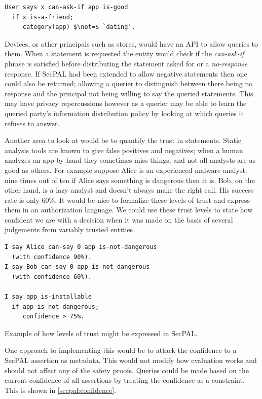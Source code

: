 \documentclass[a4paper,sfsidenotes]{%
  scrartcl%
}
\begin{document}
\begin{lstlisting}[language=SecPAL,mathescape=true]
User says x can-ask-if app is-good
  if x is-a-friend;
     category(app) $\not=$ `dating'.
\end{lstlisting}

Devices, or other principals such as stores, would have an API to allow queries
to them. When a statement is requested the entity would check if
the \emph{can-ask-if} phrase is satisfied before distributing the statement
asked for or a \emph{no-response} response.  If SecPAL had been extended
to allow negative statements then one could also be returned; allowing a querier
to distinguish between there being no response and the principal not being
willing to say the queried statements.  This may have privacy repercussions
however as a querier may be able to learn the queried party's information
distribution policy by looking at which queries it refuses to answer.  

Another area to look at would be to quantify the trust in statements. Static
analysis tools are known to give false positives and negatives; when a human
analyzes an app by hand they sometimes miss things; and not all analysts are as
good as others.  For example suppose Alice is an experienced malware analyst:
nine times out of ten if Alice says something is dangerous then it is.  Bob, on
the other hand, is a lazy analyst and doesn't always make the right call.  His
success rate is only 60\%.  It would be nice to formalize these levels of trust
and express them in an authorization language. We could use these trust levels
to state how confident we are with a decision when it was made on the basis of
several judgements from variably trusted entities.

\begin{marginfigure}
  \begin{lstlisting}[language=SecPAL]
I say Alice can-say 0 app is-not-dangerous 
  (with confidence 90%).
I say Bob can-say 0 app is-not-dangerous
  (with confidence 60%).

I say app is-installable 
  if app is-not-dangerous;
     confidence > 75%.
  \end{lstlisting}
  \caption{Example of how levels of trust might be expressed in SecPAL.}
  \label{secpal:confidence}
\end{marginfigure}

One approach to implementing this would be to attack the confidence to a SecPAL
assertion as metadata.  This would not modify how evaluation works
and should not affect any of the safety proofs.  Queries could be made based on
the current confidence of all assertions by treating the confidence as a
constraint.  This is shown in \autoref{secpal:confidence}.
\end{document}
